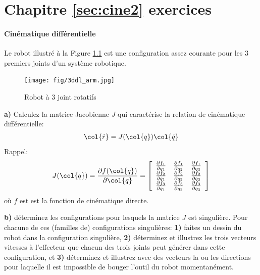 \chapter{Chapitre \ref{sec:cine2} exercices}
\label{sec:exer_diffkinematic}

\subsubsection{Cinématique différentielle}

Le robot illustré à la Figure \ref{fig:3ddl_arm} est une configuration assez courante pour les 3 premiers joints d'un système robotique.
\begin{figure}[htbp]
	\centering
		\texttt{[image: fig/3ddl\_arm.jpg]}
	\caption{Robot à 3 joint rotatifs}
	\label{fig:3ddl_arm}
\end{figure}

\textbf{a)} Calculez la matrice Jacobienne $J$ qui caractérise la relation de cinématique différentielle:
\begin{align}
\col{\dot{r}} = J(\col{q}) \col{\dot{q}}
\end{align}
Rappel: 
\begin{align}
J(\col{q}) = \frac{ \partial f(\col{q}) }{ \partial \col{q}} = 
\left[ \begin{array}{ c c c} 
\frac{ \partial f_1 }{ \partial q_1} & \frac{  \partial f_1 }{ \partial q_2} & \frac{ \partial f_1 }{ \partial q_3}  \\
\frac{ \partial f_2 }{ \partial q_1} & \frac{ \partial f_2 }{ \partial q_2} & \frac{ \partial f_2 }{ \partial q_3}   \\
\frac{ \partial f_3 }{ \partial q_1} & \frac{ \partial f_3 }{ \partial q_2} & \frac{ \partial f_3 }{ \partial q_3}  
\end{array} 
\right] 
\end{align}
où $f$ est est la fonction de cinématique directe.

\textbf{b)} déterminez les configurations pour lesquels la matrice $J$ est singulière. Pour chacune de ces (familles de) configurations singulières: \textbf{1)} faites un dessin du robot dans la configuration singulière, \textbf{2)} déterminez et illustrez les trois vecteurs vitesses à l'effecteur que chacun des trois joints peut générer dans cette configuration, et \textbf{3)} déterminez et illustrez avec des vecteurs la ou les directions pour laquelle il est impossible de bouger l'outil du robot momentanément. 








